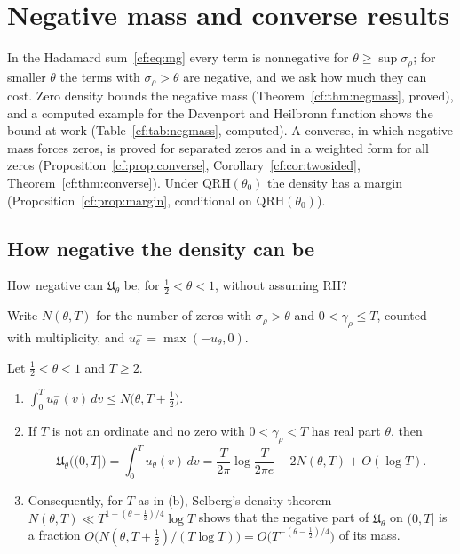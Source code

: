 \section{Negative mass and converse results}\label{cf:sec:negmass}

In the Hadamard sum~\eqref{cf:eq:mg} every term is nonnegative for $\theta\ge\sup\sigma_\rho$; for smaller $\theta$ the terms with $\sigma_\rho>\theta$ are negative, and we ask how much they can cost. Zero density bounds the negative mass (Theorem~\ref{cf:thm:negmass}, proved), and a computed example for the Davenport and Heilbronn function shows the bound at work (Table~\ref{cf:tab:negmass}, computed). A converse, in which negative mass forces zeros, is proved for separated zeros and in a weighted form for all zeros (Proposition~\ref{cf:prop:converse}, Corollary~\ref{cf:cor:twosided}, Theorem~\ref{cf:thm:converse}). Under $\mathrm{QRH}(\theta_0)$ the density has a margin (Proposition~\ref{cf:prop:margin}, conditional on $\mathrm{QRH}(\theta_0)$).

\subsection{How negative the density can be}

\begin{problem}\label{cf:op:negdepth}
How negative can $\mathfrak U_\theta$ be, for $\frac12<\theta<1$, without assuming RH?
\end{problem}

Write $N(\theta,T)$ for the number of zeros with $\sigma_\rho>\theta$ and $0<\gamma_\rho\le T$, counted with multiplicity, and $u_\theta^-=\max(-u_\theta,0)$.

\begin{theorem}\label{cf:thm:negmass}
Let $\frac12<\theta<1$ and $T\ge2$.
\begin{enumerate}
\item[(a)] $\displaystyle\int_0^Tu_\theta^-(v)\,dv\le N\bigl(\theta,T+\tfrac12\bigr)$.
\item[(b)] If $T$ is not an ordinate and no zero with $0<\gamma_\rho<T$ has real part $\theta$, then
\[
\mathfrak U_\theta\bigl((0,T]\bigr)=\int_0^Tu_\theta(v)\,dv=\frac T{2\pi}\log\frac T{2\pi e}-2N(\theta,T)+O(\log T).
\]
\item[(c)] Consequently, for $T$ as in (b), Selberg's density theorem $N(\theta,T)\ll T^{1-(\theta-\frac12)/4}\log T$ \cite{Selberg46} shows that the negative part of $\mathfrak U_\theta$ on $(0,T]$ is a fraction $O\bigl(N(\theta,T+\frac12)/(T\log T)\bigr)=O\bigl(T^{-(\theta-\frac12)/4}\bigr)$ of its mass.
\end{enumerate}
\end{theorem}

